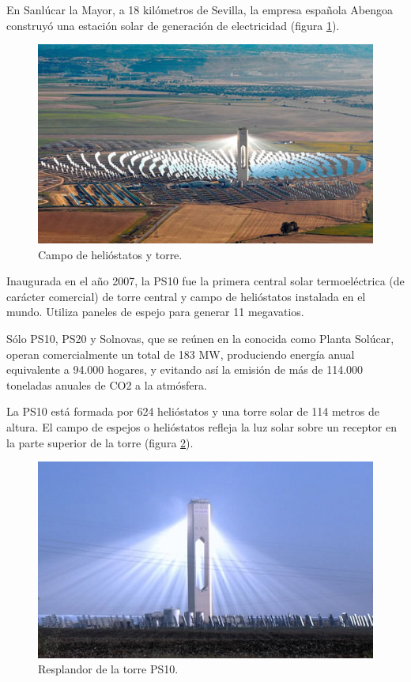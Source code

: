 En Sanlúcar la Mayor, a 18 kilómetros de Sevilla, la empresa española Abengoa construyó una estación solar de generación de electricidad (figura \ref{fig:FotosPaginasWebHeliostatos/unnamed(3).jpg}).

\begin{figure}[h!]
  	\centering
	\includegraphics[width=\textwidth]{FotosPaginasWebHeliostatos/unnamed(3).jpg}
	\caption{Campo de helióstatos y torre.
	\label{fig:FotosPaginasWebHeliostatos/unnamed(3).jpg}}
\end{figure}

Inaugurada en el año 2007, la PS10 fue la primera central solar termoeléctrica (de carácter comercial) de torre central y campo de helióstatos instalada en el mundo. Utiliza paneles de espejo para generar 11 megavatios.

Sólo PS10, PS20 y Solnovas, que se reúnen en la conocida como Planta Solúcar, operan comercialmente un total de 183 MW, produciendo energía anual equivalente a 94.000 hogares, y evitando así la emisión de más de 114.000 toneladas anuales de CO2 a la atmósfera.

La PS10 está formada por 624 helióstatos y una torre solar de 114 metros de altura. El campo de espejos o helióstatos refleja la luz solar sobre un receptor en la parte superior de la torre (figura \ref{fig:FotosPaginasWebHeliostatos/unnamed(5).jpg}).

\begin{figure}[h!]
  	\centering
	\includegraphics[width=\textwidth]{FotosPaginasWebHeliostatos/unnamed(5).jpg}
	\caption{Resplandor de la torre PS10.
	\label{fig:FotosPaginasWebHeliostatos/unnamed(5).jpg}}
\end{figure}

